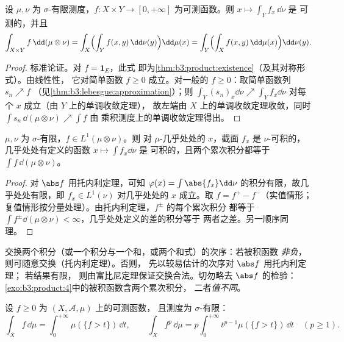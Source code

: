 \begin{theorem}[托内利]\label{thm:b3:product:tonelli}
设 $\mu, \nu$ 为 $\sigma$-有限测度，$f \colon X\times Y \to [0,
+\infty]$ 为可测函数。则 $x \mapsto \int_Y f_x\,\dd\nu$ 是
可测的，并且
\[
\int_{X\times Y}f\,\dd(\mu\otimes\nu)
= \int_X\Bigl(\int_Y f(x,y)\,\dd\nu(y)\Bigr)\dd\mu(x)
= \int_Y\Bigl(\int_X f(x,y)\,\dd\mu(x)\Bigr)\dd\nu(y).
\]
\end{theorem}

\begin{proof}
标准论证。对 $f = \mathbf 1_E$，此式
即为\cref{thm:b3:product:existence}（及其对称形式）。由线性性，
它对简单函数 $f \geq 0$ 成立。对一般的 $f \geq
0$：取简单函数列 $s_n \nearrow f$
（见\cref{thm:b3:lebesgue:approximation}）；则 $\int_Y(s_n)_x
\dd\nu \nearrow \int_Y f_x\dd\nu$ 对每个 $x$ 成立（由 $Y$ 上的单调收敛定理），
故左端由 $X$ 上的单调收敛定理收敛，同时
$\int s_n\,\dd(\mu\otimes\nu) \nearrow \int f$ 由
乘积测度上的单调收敛定理得出。
\end{proof}

\begin{theorem}[富比尼]\label{thm:b3:product:fubini}
$\mu, \nu$ 为 $\sigma$-有限，$f \in L^1(\mu\otimes\nu)$。则
对 $\mu$-几乎处处的 $x$，截面 $f_x$ 是 $\nu$-可积的，
几乎处处有定义的函数 $x \mapsto \int f_x\dd\nu$ 是
可积的，且两个累次积分都等于
$\int f\,\dd(\mu\otimes\nu)$。
\end{theorem}

\begin{proof}
对 $\abs f$ 用托内利定理，可知 $\varphi(x) = \int\abs{f_x}
\dd\nu$ 的积分有限，故几乎处处有限，即 $f_x \in
L^1(\nu)$ 对几乎处处的 $x$ 成立。取 $f = f^+ - f^-$（实值情形；
复值情形按分量处理）。由托内利定理，$f^\pm$ 的每个累次积分
都等于 $\int f^\pm\dd(\mu\otimes\nu) <
\infty$，几乎处处定义的差的积分等于
两者之差。另一顺序同理。
\end{proof}

\begin{method}\label{met:b3:product:fubini}
交换两个积分（或一个积分与一个和，或两个和式）的次序：若被积函数
\emph{非负}，则可随意交换（托内利定理）。否则，
先以较易估计的次序对 $\abs f$ 用托内利定理；
若结果有限，
则由富比尼定理保证交换合法。切勿略去
$\abs f$ 的检验：\cref{exo:b3:product:4}中的被积函数含两个累次积分，
二者\emph{值不同}。
\end{method}

\begin{proposition}[层蛋糕公式]\label{prop:b3:product:layercake}
设 $f \geq 0$ 为 $(X, \mathcal A, \mu)$ 上的可测函数，
且测度为 $\sigma$-有限：
\[
\int_X f\,\dd\mu = \int_0^{+\infty}\mu(\{f > t\})\,\dd t,
\qquad
\int_X f^p\,\dd\mu = p\int_0^{+\infty}t^{p-1}\mu(\{f >
t\})\,\dd t \quad (p \geq 1).
\]
\end{proposition}

